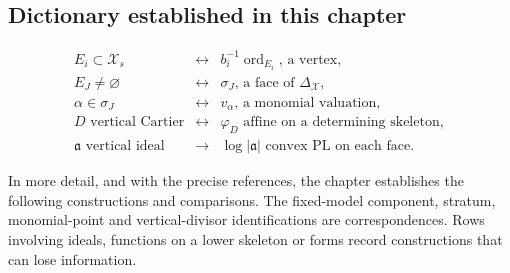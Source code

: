 \begin{samepage}
\section{Dictionary established in this chapter}

\[
\begin{array}{ccl}
E_i\subset\mathcal X_s
 &\longleftrightarrow&
 b_i^{-1}\operatorname{ord}_{E_i}\text{, a vertex},\\[1mm]
E_J\neq\varnothing
 &\longleftrightarrow&
 \sigma_J\text{, a face of }\Delta_{\mathcal X},\\[1mm]
\alpha\in\sigma_J
 &\longleftrightarrow&
 v_\alpha\text{, a monomial valuation},\\[1mm]
D\text{ vertical Cartier}
 &\longleftrightarrow&
 \varphi_D\text{ affine on a determining skeleton},\\[1mm]
\mathfrak a\text{ vertical ideal}
 &\longrightarrow&
 \log|\mathfrak a|\text{ convex PL on each face}.
\end{array}
\]
\end{samepage}

In more detail, and with the precise references, the chapter establishes the
following constructions and comparisons. The fixed-model component, stratum,
monomial-point and vertical-divisor identifications are correspondences.
Rows involving ideals, functions on a lower skeleton or forms record
constructions that can lose information.

